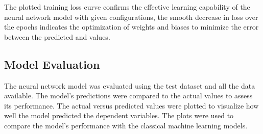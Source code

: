 The plotted training loss curve confirms the effective learning capability of the neural network model with given configurations, the smooth decrease in loss over the epochs indicates
the optimization of weights and biases to minimize the error between the predicted and values.


\subsection*{Model Evaluation}

The neural network model was evaluated using the test dataset and all the data available. The model's predictions were compared to the actual values to assess its performance.
The actual versus predicted values were plotted to visualize how well the model predicted the dependent variables. The plots were used to compare the model's performance with the
classical machine learning models.

